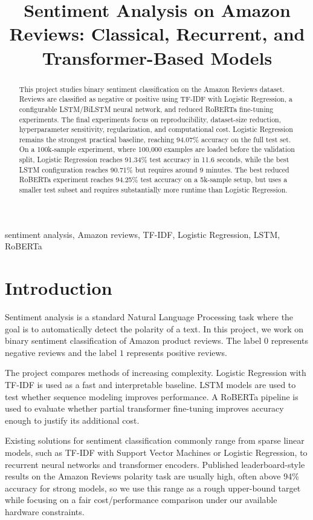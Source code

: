 \documentclass[conference]{IEEEtran}
\title{Sentiment Analysis on Amazon Reviews: Classical, Recurrent, and Transformer-Based Models}
\author{
\IEEEauthorblockN{Nolan Capomaggio and Mathis Morra-Fischer}
\IEEEauthorblockA{Group 19\\
Introduction to Artificial Intelligence\\
Project 7}
}
\begin{document}
\maketitle

\begin{abstract}
This project studies binary sentiment classification on the Amazon Reviews
dataset. Reviews are classified as negative or positive using TF-IDF with
Logistic Regression, a configurable LSTM/BiLSTM neural network, and reduced
RoBERTa fine-tuning experiments. The final experiments focus on reproducibility,
dataset-size reduction, hyperparameter sensitivity, regularization, and
computational cost. Logistic Regression remains the strongest practical
baseline, reaching 94.07\% accuracy on the full test set. On a 100k-sample
experiment, where 100,000 examples are loaded before the validation split,
Logistic Regression reaches 91.34\% test accuracy in 11.6 seconds, while the
best LSTM configuration reaches 90.71\% but requires around 9 minutes. The best
reduced RoBERTa experiment reaches 94.25\% test accuracy on a 5k-sample setup,
but uses a smaller test subset and requires substantially more runtime than
Logistic Regression.
\end{abstract}

\begin{IEEEkeywords}
sentiment analysis, Amazon reviews, TF-IDF, Logistic Regression, LSTM, RoBERTa
\end{IEEEkeywords}

\section{Introduction}
Sentiment analysis is a standard Natural Language Processing task where the
goal is to automatically detect the polarity of a text. In this project, we
work on binary sentiment classification of Amazon product reviews. The label
$0$ represents negative reviews and the label $1$ represents positive reviews.

The project compares methods of increasing complexity. Logistic Regression with
TF-IDF is used as a fast and interpretable baseline. LSTM models are used to
test whether sequence modeling improves performance. A RoBERTa pipeline is used
to evaluate whether partial transformer fine-tuning improves accuracy enough to
justify its additional cost.

Existing solutions for sentiment classification commonly range from sparse
linear models, such as TF-IDF with Support Vector Machines or Logistic
Regression, to recurrent neural networks and transformer encoders. Published
leaderboard-style results on the Amazon Reviews polarity task are usually high,
often above 94\% accuracy for strong models, so we use this range as a rough
upper-bound target while focusing on a fair cost/performance comparison under
our available hardware constraints.
\end{document}

